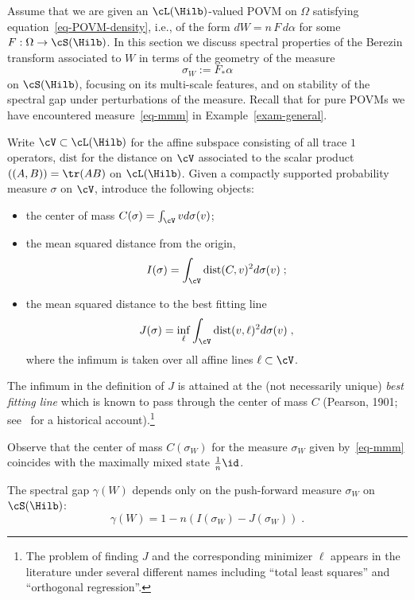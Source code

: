 Assume that we are given an $\cL(\Hilb)$-valued POVM on $\Omega$ satisfying equation~\eqref{eq-POVM-density}, i.e., of the form $dW = n\,F\,d\alpha$ for some $F:\Omega \to \cS(\Hilb)$. In this section we discuss spectral properties of the Berezin transform associated to $W$ in terms of the geometry of the measure
\begin{equation}\label{eq-mmm}
\sigma_W:= F_*\alpha
\end{equation}
on $\cS(\Hilb)$, focusing on its multi-scale features, and on stability of the spectral gap under perturbations of the measure. Recall that for pure POVMs we have encountered measure~\eqref{eq-mmm} in Example~\ref{exam-general}.



Write $\cV \subset \cL(\Hilb)$ for the affine subspace consisting of all trace $1$ operators, $\text{dist}$ for the distance on $\cV$ associated to the scalar product $((A,B))=\tr(AB)$ on $\cL(\Hilb)$. Given a compactly supported probability measure $\sigma$ on $\cV$, introduce the following objects:
\begin{itemize}
\item the center of mass $C(\sigma)= \int_\cV v d\sigma(v)$;
\item the mean squared distance from the origin,
\[
I(\sigma)= \int_\cV \text{dist}(C,v)^2 d\sigma(v)\;;
\]
\item the mean squared distance to the best fitting line
\[
J(\sigma) = \inf_\ell \int_\cV \text{dist}(v,\ell)^2 d\sigma(v)\;,
\]
where the infimum is taken over all affine lines $\ell \subset \cV$.
\end{itemize}
The infimum in the definition of $J$ is attained at the (not necessarily unique) \emph{best fitting line} which is known to pass through the center of mass $C$ (Pearson, 1901; see~\cite[p.~188]{Fare} for a historical account).\footnote{The problem of finding $J$ and the corresponding minimizer $\ell$ appears in the literature under several different names including ``total least squares'' and ``orthogonal regression''.}

Observe that the center of mass $C(\sigma_W)$ for the measure $\sigma_W$ given by~\eqref{eq-mmm} coincides with the maximally mixed state $\frac{1}{n}\id$.


%

\begin{theo}\label{prop-best-fit}
The spectral gap $\gamma(W)$ depends
only on the push-forward measure $\sigma_W$ on $\cS(\Hilb)$:
\[
\gamma(W) = 1 - n(I(\sigma_W)-J(\sigma_W))\;.
\]
\end{theo}

